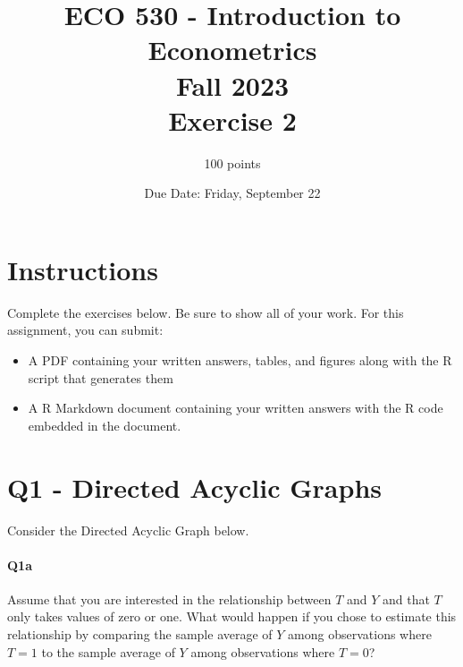 \documentclass[12pt]{article}		%
\title{ECO 530 - Introduction to Econometrics \\ Fall 2023 \\Exercise 2}
\author{100 points}
\date{Due Date: Friday, September 22}
\begin{document}
\maketitle

\section*{Instructions}
Complete the exercises below. Be sure to show all of your work. For this assignment, you can submit:
\begin{itemize}
	\item A PDF containing your written answers, tables, and figures along with the R script that generates them
	\item A R Markdown document containing your written answers with the R code embedded in the document. 
\end{itemize}


\clearpage


\section*{Q1 - Directed Acyclic Graphs}
Consider the Directed Acyclic Graph below. 

\FloatBarrier
\begin{figure}[h]
	\centering
\end{figure}

\FloatBarrier

\paragraph*{Q1a}
Assume that you are interested in the relationship between $T$ and $Y$ and that $T$ only takes values of zero or one. What would happen if you chose to estimate this relationship by comparing the sample average of $Y$ among observations where $T=1$ to the sample average of $Y$ among observations where $T=0$? 
\end{document}

